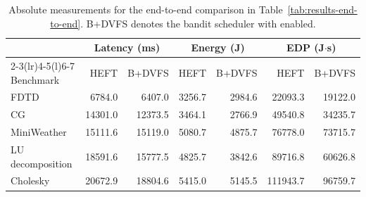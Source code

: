 \begin{table}[!htbp]
\centering
\begingroup
\scriptsize
\setlength{\tabcolsep}{3pt}
\begin{tabular}{@{}lrrrrrr@{}}
\toprule
& \multicolumn{2}{c}{Latency (ms)}
& \multicolumn{2}{c}{Energy (J)}
& \multicolumn{2}{c}{EDP (J\(\cdot\)s)} \\
\cmidrule(lr){2-3}\cmidrule(lr){4-5}\cmidrule(l){6-7}
Benchmark
& HEFT & B+DVFS
& HEFT & B+DVFS
& HEFT & B+DVFS \\
\midrule
FDTD & 6784.0 & 6407.0 & 3256.7 & 2984.6 & 22093.3 & 19122.0 \\
CG & 14301.0 & 12373.5 & 3464.1 & 2766.9 & 49540.8 & 34235.7 \\
MiniWeather & 15111.6 & 15119.0 & 5080.7 & 4875.7 & 76778.0 & 73715.7 \\
LU decomposition & 18591.6 & 15777.5 & 4825.7 & 3842.6 & 89716.8 & 60626.8 \\
Cholesky & 20672.9 & 18804.6 & 5415.0 & 5145.5 & 111943.7 & 96759.7 \\
\bottomrule
\end{tabular}
\endgroup
\caption{Absolute measurements for the end-to-end comparison in Table~\ref{tab:results-end-to-end}. B+DVFS denotes the bandit scheduler with \WinDVFS{} enabled.}
\label{tab:appendix-end-to-end-absolute}
\end{table}


